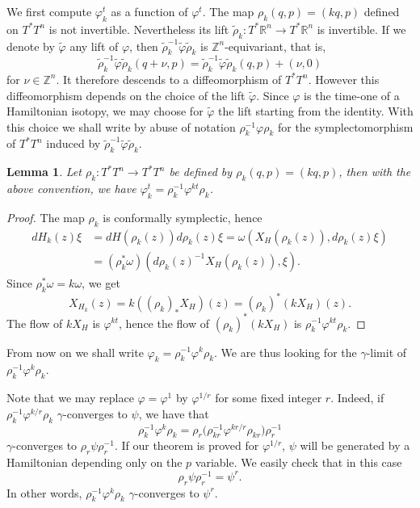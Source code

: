 \documentclass[JEP,XML,SOM,NoFloatCountersInSection,Unicode,published]{cedram}
\numberwithin{equation}{section}
\theoremstyle{plain}
\newtheorem{lemma}[theorem]{Lemma}
\theoremstyle{definition}
\theoremstyle{remark}
\begin{document}
We first compute
$\varphi_{k}^t$ as a function of $\varphi^t$.
The map $\rho_k(q,p)=(kq,p)$ defined on $T^*T^n$ is not invertible. Nevertheless its lift $\widetilde \rho_k: T^* {\mathbb R}^n \to T^* {\mathbb R}^n$ is invertible.
If we denote by $\widetilde \varphi$ any lift of $\varphi$, then $\widetilde \rho_k^{-1}\widetilde\varphi \widetilde \rho_k$ is $ \mathbb Z^n$-equivariant, that is,
\[
\widetilde \rho_k^{-1}\widetilde\varphi \widetilde \rho_k (q+\nu,p)=\widetilde \rho_k^{-1}\widetilde\varphi \widetilde \rho_k(q,p)+ (\nu,0)
\]
for $\nu \in \mathbb Z^n$. It therefore descends to a diffeomorphism of $T^*T^n$. However this diffeomorphism depends on the choice of the lift $\widetilde \varphi$. Since
$\varphi$ is the time-one of a Hamiltonian isotopy, we may choose for $\widetilde\varphi$ the lift starting from the identity. With this choice we shall write by abuse of notation $\rho_k^{-1}\varphi \rho_k$ for the symplectomorphism of $T^*T^n$ induced by $\widetilde \rho_k^{-1}\widetilde\varphi \widetilde \rho_k$.

\begin{lemma}\label{Lemma-5.1} Let $\rho_{k}: T^*T^n \to T^*T^n$ be defined by $\rho_k(q,p) = (kq,p)$, then with the above convention, we have
$\varphi_{k}^{t} = \rho_k^{-1} \varphi^{kt} \rho_{k}$.
\end{lemma}
\begin{proof} The map $\rho_{k}$ is conformally symplectic, hence
\begin{align*}
dH_{k}(z)\xi &= dH(\rho_{k}(z)) d\rho_{k}(z) \xi = \omega
\left(X_{H}(\rho_{k}(z)), d\rho_{k} (z)\xi\right)\\
&= (\rho^{*}_{k}\omega) (d\rho_{k}(z)^{-1} X_{H} (\rho_{k}(z)),\xi).
\end{align*}
Since $\rho^{*}_{k}\omega = k\omega$, we get
\[
X_{H_{k}} (z) = k \left((\rho_{k})_{*} X_{H}\right) (z) = (\rho_{k})^{*} (k X_{H})(z).
\]
The flow of $kX_{H}$ is $\varphi^{kt}$, hence the flow of
$(\rho_{k})^{*} (k X_{H})$ is $\rho^{-1}_{k}
\varphi^{kt}\rho_{k}$. \end{proof}

From now on we shall write $\varphi_k= \rho_k^{-1}\varphi^k \rho_k$.
We are thus looking for the $\gamma$-limit of
$\rho^{-1}_{k}\varphi^{k}\rho_{k}$.

Note that we may replace $\varphi = \varphi^{1}$ by
$\varphi^{1/r}$ for some fixed integer $r$. Indeed, if $\rho^{-1}_{k}
\varphi^{k/r} \rho_{k}$ $\gamma$-converges to $\psi$, we have that
\[
\rho^{-1}_{k} \varphi^{k}\rho_{k} = \rho_{r} \bigl(\rho_{kr}^{-1}
\varphi^{kr/r} \rho_{kr} \bigr) \rho^{-1}_{r}
\]
$\gamma$-converges to $\rho_{r} \psi \rho^{-1}_{r}$. If our theorem is
proved for $\varphi^{1/r}$, $\psi$ will be generated by a
Hamiltonian depending only on the $p$ variable. We easily check that
in this case
\[
\rho_{r} \psi \rho^{-1}_{r} = \psi^{r}.
\]
In other words, $\rho^{-1}_{k} \varphi^{k}\rho_{k}$ $\gamma$-converges to
$\psi^{r}$.
\end{document}
